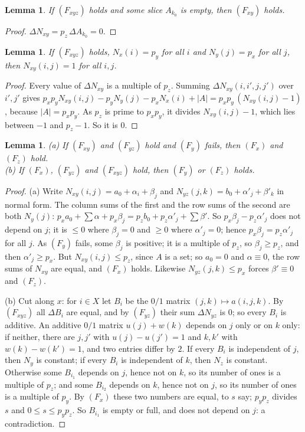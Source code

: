 \documentclass[11pt,a4paper]{amsart}
\newtheorem{lemma}[theorem]{Lemma}
\theoremstyle{definition}
\theoremstyle{remark}
\begin{document}
\begin{lemma}\label{N:lem:four}
If $(F_{xyz})$ holds and some slice $A_{k_0}$ is empty, then $(F_{xy})$ holds.
\end{lemma}
\begin{proof}
$\Delta N_{xy}=p_z\,\Delta A_{k_0}=0$.
\end{proof}

\begin{lemma}\label{N:lem:five}
If $(F_{xyz})$ holds, $N_x(i)=p_y$ for all $i$ and $N_y(j)=p_x$ for all $j$, then $N_{xy}(i,j)=1$ for all $i,j$.
\end{lemma}
\begin{proof}
Every value of $\Delta N_{xy}$ is a multiple of $p_z$. Summing $\Delta N_{xy}(i,i',j,j')$ over $i',j'$ gives
$p_xp_yN_{xy}(i,j)-p_yN_y(j)-p_xN_x(i)+|A|=p_xp_y\,(N_{xy}(i,j)-1)$, because $|A|=p_xp_y$. As $p_z$ is prime to
$p_xp_y$, it divides $N_{xy}(i,j)-1$, which lies between $-1$ and $p_z-1$. So it is $0$.
\end{proof}

\begin{lemma}\label{N:lem:six}
\textup{(a)} If $(F_{xy})$ and $(F_{yz})$ hold and $(F_y)$ fails, then $(F_x)$ and $(F_z)$ hold.\\
\textup{(b)} If $(F_x)$, $(F_{yz})$ and $(F_{xyz})$ hold, then $(F_y)$ or $(F_z)$ holds.
\end{lemma}
\begin{proof}
(a) Write $N_{xy}(i,j)=a_0+\alpha_i+\beta_j$ and $N_{yz}(j,k)=b_0+\alpha'_j+\beta'_k$ in normal form. The column
sums of the first and the row sums of the second are both $N_y(j)$:
$p_xa_0+\sum\alpha+p_x\beta_j=p_zb_0+p_z\alpha'_j+\sum\beta'$. So $p_x\beta_j-p_z\alpha'_j$ does not depend on $j$;
it is $\le 0$ where $\beta_j=0$ and $\ge 0$ where $\alpha'_j=0$; hence $p_x\beta_j=p_z\alpha'_j$ for all $j$. As
$(F_y)$ fails, some $\beta_j$ is positive; it is a multiple of $p_z$, so $\beta_j\ge p_z$, and then
$\alpha'_j\ge p_x$. But $N_{xy}(i,j)\le p_z$, since $A$ is a set; so $a_0=0$ and $\alpha\equiv0$, the row sums of
$N_{xy}$ are equal, and $(F_x)$ holds. Likewise $N_{yz}(j,k)\le p_x$ forces $\beta'\equiv 0$ and $(F_z)$.

(b) Cut along $x$: for $i\in X$ let $B_i$ be the $0/1$ matrix $(j,k)\mapsto a(i,j,k)$. By $(F_{xyz})$ all
$\Delta B_i$ are equal, and by $(F_{yz})$ their sum $\Delta N_{yz}$ is $0$; so every $B_i$ is additive. An
additive $0/1$ matrix $u(j)+w(k)$ depends on $j$ only or on $k$ only: if neither, there are $j,j'$ with
$u(j)-u(j')=1$ and $k,k'$ with $w(k)-w(k')=1$, and two entries differ by $2$. If every $B_i$ is independent of
$j$, then $N_y$ is constant; if every $B_i$ is independent of $k$, then $N_z$ is constant. Otherwise some $B_{i_1}$
depends on $j$, hence not on $k$, so its number of ones is a multiple of $p_z$; and some $B_{i_2}$ depends on $k$,
hence not on $j$, so its number of ones is a multiple of $p_y$. By $(F_x)$ these two numbers are equal, to $s$
say; $p_yp_z$ divides $s$ and $0\le s\le p_yp_z$. So $B_{i_1}$ is empty or full, and does not depend on $j$: a
contradiction.
\end{proof}
\end{document}
